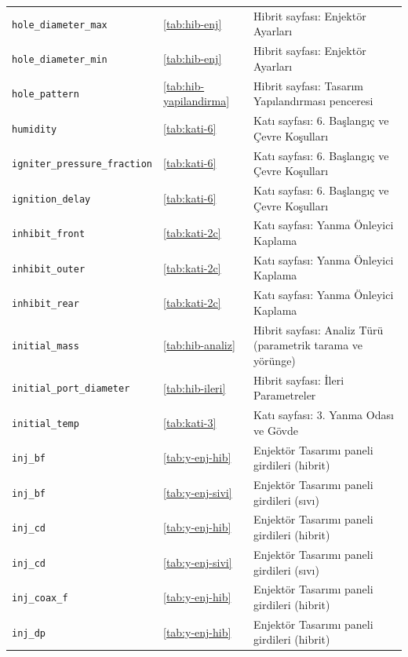\documentclass[11pt,a4paper]{article}
\begin{document}
{\begin{longtable}{@{}>{\raggedright\arraybackslash}p{5.2cm}p{1.4cm}>{\raggedright\arraybackslash}p{7.4cm}@{}}
\texttt{hole\_\allowbreak{}diameter\_\allowbreak{}max} & \ref{tab:hib-enj} & Hibrit sayfası: Enjektör Ayarları \\
\texttt{hole\_\allowbreak{}diameter\_\allowbreak{}min} & \ref{tab:hib-enj} & Hibrit sayfası: Enjektör Ayarları \\
\texttt{hole\_\allowbreak{}pattern} & \ref{tab:hib-yapilandirma} & Hibrit sayfası: Tasarım Yapılandırması penceresi \\
\texttt{humidity} & \ref{tab:kati-6} & Katı sayfası: 6. Başlangıç ve Çevre Koşulları \\
\texttt{igniter\_\allowbreak{}pressure\_\allowbreak{}fraction} & \ref{tab:kati-6} & Katı sayfası: 6. Başlangıç ve Çevre Koşulları \\
\texttt{ignition\_\allowbreak{}delay} & \ref{tab:kati-6} & Katı sayfası: 6. Başlangıç ve Çevre Koşulları \\
\texttt{inhibit\_\allowbreak{}front} & \ref{tab:kati-2c} & Katı sayfası: Yanma Önleyici Kaplama \\
\texttt{inhibit\_\allowbreak{}outer} & \ref{tab:kati-2c} & Katı sayfası: Yanma Önleyici Kaplama \\
\texttt{inhibit\_\allowbreak{}rear} & \ref{tab:kati-2c} & Katı sayfası: Yanma Önleyici Kaplama \\
\texttt{initial\_\allowbreak{}mass} & \ref{tab:hib-analiz} & Hibrit sayfası: Analiz Türü (parametrik tarama ve yörünge) \\
\texttt{initial\_\allowbreak{}port\_\allowbreak{}diameter} & \ref{tab:hib-ileri} & Hibrit sayfası: İleri Parametreler \\
\texttt{initial\_\allowbreak{}temp} & \ref{tab:kati-3} & Katı sayfası: 3. Yanma Odası ve Gövde \\
\texttt{inj\_\allowbreak{}bf} & \ref{tab:y-enj-hib} & Enjektör Tasarımı paneli girdileri (hibrit) \\
\texttt{inj\_\allowbreak{}bf} & \ref{tab:y-enj-sivi} & Enjektör Tasarımı paneli girdileri (sıvı) \\
\texttt{inj\_\allowbreak{}cd} & \ref{tab:y-enj-hib} & Enjektör Tasarımı paneli girdileri (hibrit) \\
\texttt{inj\_\allowbreak{}cd} & \ref{tab:y-enj-sivi} & Enjektör Tasarımı paneli girdileri (sıvı) \\
\texttt{inj\_\allowbreak{}coax\_\allowbreak{}f} & \ref{tab:y-enj-hib} & Enjektör Tasarımı paneli girdileri (hibrit) \\
\texttt{inj\_\allowbreak{}dp} & \ref{tab:y-enj-hib} & Enjektör Tasarımı paneli girdileri (hibrit) \\

\end{longtable}}
\end{document}
